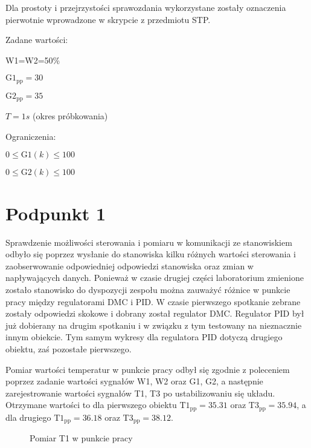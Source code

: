 \bigskip

\bigskip

Dla prostoty i przejrzystości sprawozdania wykorzystane zostały oznaczenia pierwotnie wprowadzone w skrypcie z przedmiotu STP.

\bigskip

Zadane wartości:

\smallskip

W1=W2=50\%

\smallskip

$\mathrm{G1_{pp}}=30$

\smallskip

$\mathrm{G2_{pp}}=35$

\smallskip

$T=1s$ (okres próbkowania)

\bigskip

Ograniczenia:

\smallskip

$0 \le \mathrm{G1}(k) \le 100$

$0 \le \mathrm{G2}(k) \le 100$

\chapter{Podpunkt 1}
Sprawdzenie możliwości sterowania i pomiaru w komunikacji ze stanowiskiem odbyło się poprzez wysłanie do stanowiska kilku różnych wartości sterowania i zaobserwowanie odpowiedniej odpowiedzi stanowiska oraz zmian w napływających danych. Ponieważ w czasie drugiej części laboratorium zmienione zostało stanowisko do dyspozycji zespołu można zauważyć różnice w punkcie pracy między regulatorami DMC i PID. W czasie pierwszego spotkanie zebrane zostały odpowiedzi skokowe i dobrany został regulator DMC. Regulator PID był już dobierany na drugim spotkaniu i w związku z tym testowany na nieznacznie innym obiekcie. Tym samym wykresy dla regulatora PID dotyczą drugiego obiektu, zaś pozostałe pierwszego.

Pomiar wartości temperatur w punkcie pracy odbył się zgodnie z poleceniem poprzez zadanie wartości sygnałów W1, W2 oraz G1, G2, a następnie zarejestrowanie wartości sygnałów T1, T3 po ustabilizowaniu się układu. Otrzymane wartości to dla pierwszego obiektu $\mathrm{T1_{pp}}=\num{35,31}$ oraz $\mathrm{T3_{pp}}=\num{35,94}$, a dla drugiego $\mathrm{T1_{pp}}=\num{36,18}$ oraz $\mathrm{T3_{pp}}=\num{38,12}$.

\begin{figure}[ht]
\centering

\caption{Pomiar T1 w punkcie pracy}
\label{Z1T1}
\end{figure}

